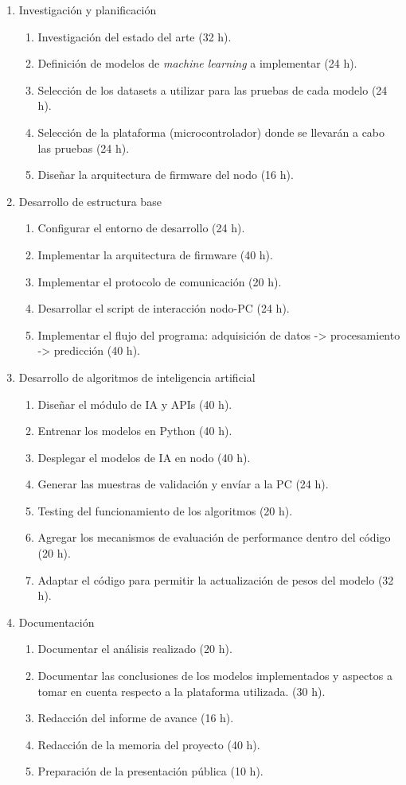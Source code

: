 \documentclass[
11pt, %
codirector, %
]{charter}
\begin{document}
\begin{enumerate}
\item Investigación y planificación
	\begin{enumerate}
	\item Investigación del estado del arte (32 h).
	\item Definición de modelos de \textit{machine learning} a implementar (24 h).
	\item Selección de los datasets a utilizar para las pruebas de cada modelo (24 h).
	\item Selección de la plataforma (microcontrolador) donde se llevarán a cabo las pruebas (24 h).
	\item Diseñar la arquitectura de firmware del nodo (16 h).
	\end{enumerate}
\item Desarrollo de estructura base
	\begin{enumerate}
	\item Configurar el entorno de desarrollo (24 h).
	\item Implementar la arquitectura de firmware (40 h).
	\item Implementar el protocolo de comunicación (20 h).
	\item Desarrollar el script de interacción nodo-PC (24 h).
	\item Implementar el flujo del programa: adquisición de datos -> procesamiento -> predicción (40 h).
	\end{enumerate}
\item Desarrollo de algoritmos de inteligencia artificial
	\begin{enumerate}
	\item Diseñar el módulo de IA y APIs (40 h).
	\item Entrenar los modelos en Python (40 h).
	\item Desplegar el modelos de IA en nodo (40 h).
	\item Generar las muestras de validación y envíar a la PC (24 h).
	\item Testing del funcionamiento de los algoritmos (20 h). 
	\item Agregar los mecanismos de evaluación de performance dentro del código (20 h).
	\item Adaptar el código para permitir la actualización de pesos del modelo (32 h). 
	\end{enumerate}
\item Documentación
	\begin{enumerate}
	\item Documentar el análisis realizado (20 h).
	\item Documentar las conclusiones de los modelos implementados y aspectos a tomar en cuenta respecto a la plataforma utilizada. (30 h).
	\item Redacción del informe de avance (16 h).
	\item Redacción de la memoria del proyecto (40 h).
	\item Preparación de la presentación pública (10 h).
	\end{enumerate}
\end{enumerate}
\end{document}
